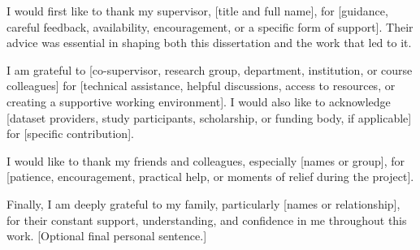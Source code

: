 
I would first like to thank my supervisor, [title and full name], for [guidance,
careful feedback, availability, encouragement, or a specific form of support].
Their advice was essential in shaping both this dissertation and the work that
led to it.

I am grateful to [co-supervisor, research group, department, institution, or
course colleagues] for [technical assistance, helpful discussions, access to
resources, or creating a supportive working environment]. I would also like to
acknowledge [dataset providers, study participants, scholarship, or funding
body, if applicable] for [specific contribution].

I would like to thank my friends and colleagues, especially [names or group],
for [patience, encouragement, practical help, or moments of relief during the
project].

Finally, I am deeply grateful to my family, particularly [names or relationship],
for their constant support, understanding, and confidence in me throughout this
work. [Optional final personal sentence.]
